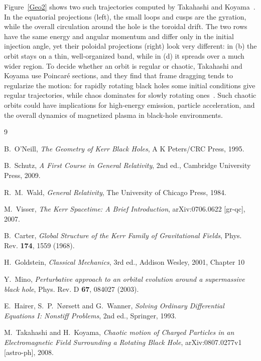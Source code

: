 \documentclass{article}
\theoremstyle{remark}
\begin{document}
Figure~\ref{Geo2} shows two such trajectories computed by Takahashi and Koyama~\cite{takahashi}. In the equatorial projections (left), the small loops and cusps are the gyration, while the overall circulation around the hole is the toroidal drift. The two rows have the same energy and angular momentum and differ only in the initial injection angle, yet their poloidal projections (right) look very different: in (b) the orbit stays on a thin, well-organized band, while in (d) it spreads over a much wider region. To decide whether an orbit is regular or chaotic, Takahashi and Koyama use Poincar\'e sections, and they find that frame dragging tends to regularize the motion: for rapidly rotating black holes some initial conditions give regular trajectories, while chaos dominates for slowly rotating ones~\cite{takahashi}. Such chaotic orbits could have implications for high-energy emission, particle acceleration, and the overall dynamics of magnetized plasma in black-hole environments.



\begin{thebibliography}{9}

B.~O'Neill, 
\emph{The Geometry of Kerr Black Holes},
A K Peters/CRC Press, 1995.

B.~Schutz,
\emph{A First Course in General Relativity},
2nd ed., Cambridge University Press, 2009.

R.~M.~Wald,
\emph{General Relativity},
The University of Chicago Press, 1984.

M.~Visser,
\emph{The Kerr Spacetime: A Brief Introduction},
arXiv:0706.0622 [gr-qc], 2007.

B.~Carter,
\emph{Global Structure of the Kerr Family of Gravitational Fields},
Phys. Rev. \textbf{174}, 1559 (1968).

H.~Goldstein,
\emph{Classical Mechanics}, 3rd ed.,
Addison Wesley, 2001, Chapter 10

Y.~Mino,
\emph{Perturbative approach to an orbital evolution around a supermassive black hole},
Phys. Rev. D \textbf{67}, 084027 (2003).

E.~Hairer, S.~P.~N{\o}rsett and G.~Wanner,
\emph{Solving Ordinary Differential Equations I: Nonstiff Problems},
2nd ed., Springer, 1993.


M.~Takahashi and H.~Koyama,
\emph{Chaotic motion of Charged Particles in an Electromagnetic Field Surrounding a Rotating Black Hole},
arXiv:0807.0277v1 [astro-ph], 2008.

\end{thebibliography}
\end{document}

